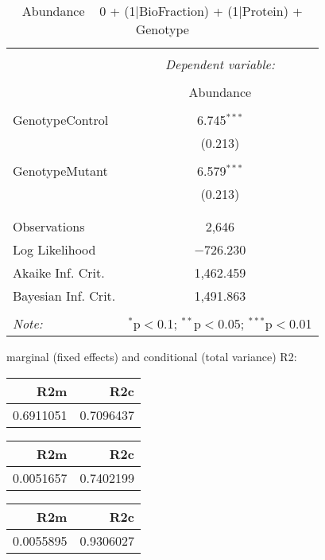 \documentclass[11pt]{report}
\begin{document}
\begin{table}[!htbp] \centering 
  \caption{Abundance ~ 0 + (1|BioFraction) + (1|Protein) + Genotype} 
  \label{} 
\begin{tabular}{@{\extracolsep{5pt}}lc} 
\\[-1.8ex]\hline 
\hline \\[-1.8ex] 
 & \multicolumn{1}{c}{\textit{Dependent variable:}} \\ 
\cline{2-2} 
\\[-1.8ex] & Abundance \\ 
\hline \\[-1.8ex] 
 GenotypeControl & 6.745$^{***}$ \\ 
  & (0.213) \\ 
  & \\ 
 GenotypeMutant & 6.579$^{***}$ \\ 
  & (0.213) \\ 
  & \\ 
\hline \\[-1.8ex] 
Observations & 2,646 \\ 
Log Likelihood & $-$726.230 \\ 
Akaike Inf. Crit. & 1,462.459 \\ 
Bayesian Inf. Crit. & 1,491.863 \\ 
\hline 
\hline \\[-1.8ex] 
\textit{Note:}  & \multicolumn{1}{r}{$^{*}$p$<$0.1; $^{**}$p$<$0.05; $^{***}$p$<$0.01} \\ 
\end{tabular} 
\end{table} 
marginal (fixed effects) and conditional (total variance) R2:

\begin{tabular}{r|r}
\hline
R2m & R2c\\
\hline
0.6911051 & 0.7096437\\
\hline
\end{tabular}

\begin{tabular}{r|r}
\hline
R2m & R2c\\
\hline
0.0051657 & 0.7402199\\
\hline
\end{tabular}

\begin{tabular}{r|r}
\hline
R2m & R2c\\
\hline
0.0055895 & 0.9306027\\
\hline
\end{tabular}
\end{document}
